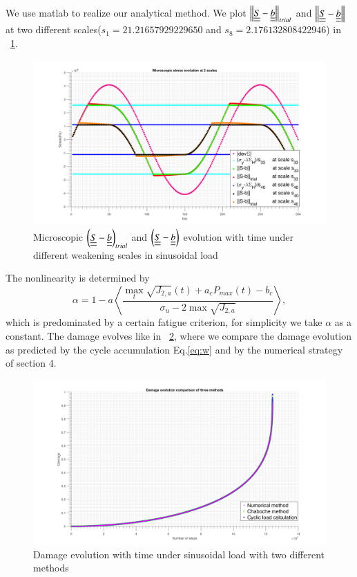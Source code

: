 \documentclass[3p,times,number,review]{elsarticle}
\newcommand{\figref}[1]{\figurename~\ref{#1}}
\begin{document}
We use matlab to realize our analytical method. We plot $\left\|  \uline{\uline{S}}-\uline{\uline{b}}\right\|_{trial}$ and $\left\|  \uline{\uline{S}}-\uline{\uline{b}}\right\|$ at two different scales($s_1=21.21657929229650$ and $s_8=2.176132808422946$) in \figref{trialsin}.
\begin{figure}[!h]
	\centering
	\includegraphics[width=\textwidth]{figures//trialsin.png} 
	\caption{Microscopic $\left(  \uline{\uline{S}}-\uline{\uline{b}}\right)_{trial}$ and $\left( \uline{\uline{S}}-\uline{\uline{b}}\right)$ evolution with time under different weakening scales in sinusoidal load}
	\label{trialsin}
\end{figure}

The nonlinearity is determined by 
$$\alpha=1 - a\left\langle \dfrac{\max\limits_{t}\sqrt{J_{2,a}}(t)+a_c{P_{max}(t)}-b_c}{ \sigma_{u} - 2\max\sqrt{J_{2,a}}}\right\rangle,$$ 
 which is predominated by a certain fatigue criterion, for simplicity we take $\alpha$ as a constant. The damage evolves like in \figref{damsin}, where we compare the damage evolution as predicted by the cycle accumulation Eq.\eqref{eq:w} and by the numerical strategy of section 4.

\begin{figure}[!h]
	\centering
	\includegraphics[width=\textwidth]{figures//damagesin.png} 
	\caption{Damage evolution with time under sinusoidal load with two different methods}
	\label{damsin}
\end{figure}
\end{document}
